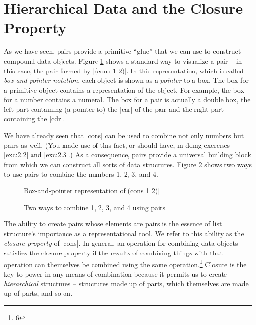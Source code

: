 
\section{Hierarchical Data and the Closure Property}
\label{sec:2.2}

As we have seen, pairs provide a primitive ``glue'' that we can use to
construct compound data objects.  Figure \ref{fig:2.2} shows a
standard way to visualize a pair -- in this case, the pair formed by
\scheme|(cons 1 2)|.  In this representation, which is called
\textit{box-and-pointer notation}, each object is shown as a
\textit{pointer} to a box.  The box for a primitive object contains a
representation of the object.  For example, the box for a number
contains a numeral.  The box for a pair is actually a double box, the
left part containing (a pointer to) the \scheme|car| of the pair and
the right part containing the \scheme|cdr|.


We have already seen that \scheme|cons| can be used to combine not
only numbers but pairs as well.  (You made use of this fact, or
should have, in doing exercises \ref{exc:2.2}
and \ref{exc:2.3}.)  As a consequence, pairs provide a universal
building block from which we can construct all sorts of data
structures.  Figure \ref{fig:2.3} shows two ways
to use pairs to combine the numbers 1, 2, 3, and 4.

\begin{figure}
\centering
\caption{Box-and-pointer representation of \verbatim(cons 1 2)|}
\label{fig:2.2}
\end{figure}

\begin{figure}
  \centering
  \placeholder
  \caption{Two ways to combine 1, 2, 3, and 4 using pairs}
  \label{fig:2.3}
\end{figure}

The ability to create pairs whose elements are pairs is the essence of
list structure's importance as a representational tool.  We refer to
this ability as the \textit{closure property} of \scheme|cons|.  In
general, an operation for combining data objects satisfies the closure
property if the results of combining things with that operation can
themselves be combined using the same operation.\footnote{6} Closure
is the key to power in any means of combination because it permits us
to create \textit{hierarchical} structures -- structures made up of
parts, which themselves are made up of parts, and so on.

